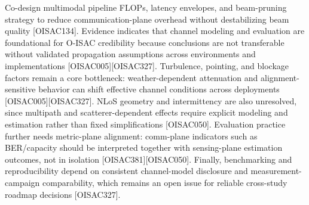 \markdownRendererUlItem Co-design multimodal pipeline FLOPs, latency envelopes, and beam-pruning strategy to reduce communication-plane overhead without destabilizing beam quality [O\markdownRendererUnderscore{}ISAC\markdownRendererUnderscore{}134].\markdownRendererUlItemEnd 
\markdownRendererUlEndTight \markdownRendererInterblockSeparator
{}
\markdownRendererSectionEnd 
\markdownRendererSectionEnd \markdownRendererSectionBegin
{}\markdownRendererInterblockSeparator
{}\markdownRendererSectionBegin
{}\markdownRendererInterblockSeparator
{}Evidence indicates that channel modeling and evaluation are foundational for O-ISAC credibility because conclusions are not transferable without validated propagation assumptions across environments and implementations [O\markdownRendererUnderscore{}ISAC\markdownRendererUnderscore{}005][O\markdownRendererUnderscore{}ISAC\markdownRendererUnderscore{}327]. Turbulence, pointing, and blockage factors remain a core bottleneck: weather-dependent attenuation and alignment-sensitive behavior can shift effective channel conditions across deployments [O\markdownRendererUnderscore{}ISAC\markdownRendererUnderscore{}005][O\markdownRendererUnderscore{}ISAC\markdownRendererUnderscore{}327]. NLoS geometry and intermittency are also unresolved, since multipath and scatterer-dependent effects require explicit modeling and estimation rather than fixed simplifications [O\markdownRendererUnderscore{}ISAC\markdownRendererUnderscore{}050]. Evaluation practice further needs metric-plane alignment: comm-plane indicators such as BER/capacity should be interpreted together with sensing-plane estimation outcomes, not in isolation [O\markdownRendererUnderscore{}ISAC\markdownRendererUnderscore{}381][O\markdownRendererUnderscore{}ISAC\markdownRendererUnderscore{}050]. Finally, benchmarking and reproducibility depend on consistent channel-model disclosure and measurement-campaign comparability, which remains an open issue for reliable cross-study roadmap decisions [O\markdownRendererUnderscore{}ISAC\markdownRendererUnderscore{}327].\markdownRendererInterblockSeparator

